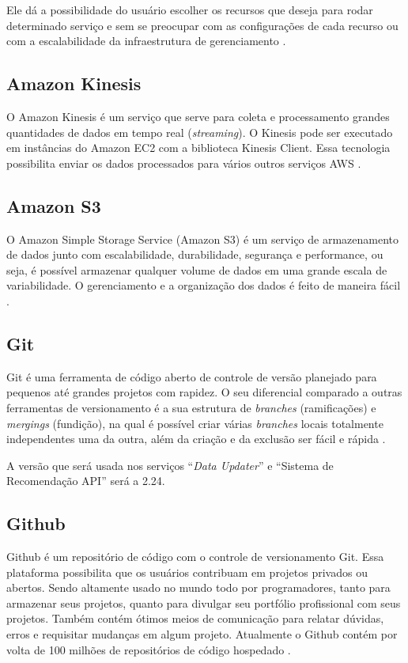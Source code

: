 Ele dá a possibilidade do usuário escolher os recursos que deseja para rodar determinado serviço e sem se preocupar com as configurações de cada recurso ou com a escalabilidade da infraestrutura de gerenciamento \cite{amazonECS:2019}.

\subsection{Amazon Kinesis}

O Amazon Kinesis é um serviço que serve para coleta e processamento grandes quantidades de dados em tempo real (\textit{streaming}). O Kinesis pode ser executado em instâncias do Amazon EC2 com a biblioteca Kinesis Client. Essa tecnologia possibilita enviar os dados processados para vários outros serviços AWS \cite{KINESIS:2019}.

\subsection{Amazon S3}

O  Amazon Simple Storage Service (Amazon S3) é um serviço de armazenamento de dados junto com escalabilidade, durabilidade, segurança e performance, ou seja, é possível armazenar qualquer volume de dados em uma grande escala de variabilidade. O gerenciamento e a organização dos dados é feito de maneira fácil \cite{S3:2019}.

\subsection{Git}

Git é uma ferramenta de código aberto de controle de versão planejado para pequenos até grandes projetos com rapidez. O seu diferencial comparado a outras ferramentas de versionamento é a sua estrutura de \textit{branches} (ramificações) e \textit{mergings} (fundição), na qual é possível criar várias \textit{branches} locais totalmente independentes uma da outra, além da criação e da exclusão ser fácil e rápida \cite{git:2019}.

A versão que será usada nos serviços “\textit{Data Updater}” e “Sistema de Recomendação API” será a 2.24.

\subsection{Github}

Github é um repositório de código com o controle de versionamento Git. Essa plataforma possibilita que os usuários contribuam em projetos privados ou abertos. Sendo altamente usado no mundo todo  por programadores, tanto para armazenar seus projetos, quanto para divulgar seu portfólio profissional com seus projetos. Também contém ótimos meios de comunicação para relatar dúvidas, erros e requisitar mudanças em algum projeto. Atualmente o Github contém por volta de 100 milhões de repositórios de código hospedado \cite{github:2019}.

